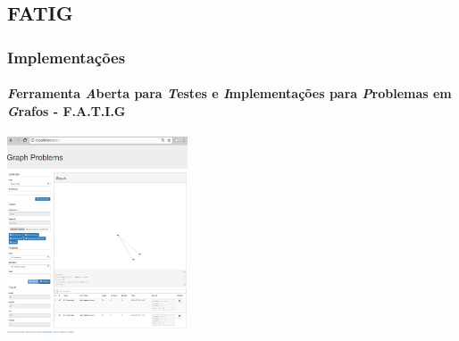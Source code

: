 

\subsection{FATIG}
\begin{frame}
\frametitle{Implementações}
\framesubtitle{{\it F}erramenta {\it A}berta para {\it T}estes e {\it I}mplementações para {\it P}roblemas em {\it G}rafos - F.A.T.I.G}
\begin{center}
\includegraphics[width=0.4\textwidth]{./img/ferramenta-tela-principal.png}
\end{center}
\end{frame}

